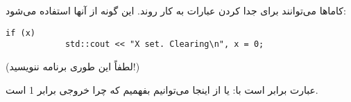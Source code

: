 \section{}
\paragraph{}\label{answer:44}
کاماها می‌توانند برای جدا کردن عبارات  به کار روند. این گونه از آنها استفاده می‌شود:
\begin{LTR}
    \begin{lstlisting}[style=C++Style]
        if (x)
            std::cout << "X set. Clearing\n", x = 0;
    \end{lstlisting}
\end{LTR}
(لطفاً این طوری برنامه ننویسید!)

عبارت  برابر است با:
\LTR\noindent
{}
\RTL
یا
\LTR\noindent
{}
\RTL
از اینجا می‌توانیم بفهمیم که چرا خروجی برابر 1 است.